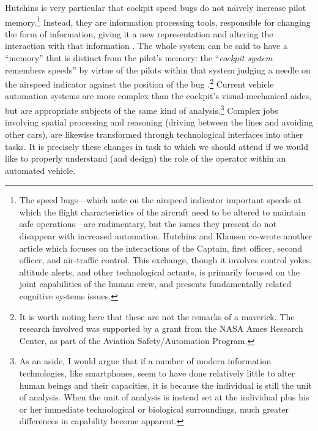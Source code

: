 Hutchins is very particular that cockpit speed bugs do not na\"{\i}vely
increase pilot memory.\footnote{The speed bugs---which note on the airspeed indicator
important speeds at which the 
flight characteristics of the aircraft need to be altered to maintain
safe operations---are rudimentary, but the issues they present do not disappear with
increased automation. Hutchins and Klausen co-wrote another
article \cite{hutchinsKlausen} which focuses on the
interactions of the Captain, first 
officer, second officer, and air-traffic control. This exchange,
though it involves control yokes, altitude alerts, and other
technological actants, is primarily focused on the joint capabilities
of the human crew, and presents fundamentally related cognitive
systems issues.} Instead, they 
are information processing tools, responsible for changing the form of
information, giving it a new representation and altering the
interaction with that information \cite[p. 282]{hutchinsCockpit}. The whole system can be said to
have a ``memory'' that is distinct from the pilot's memory: the
``\emph{cockpit system} remembers speeds'' by virtue of the pilots
within that system judging a needle on the airspeed indicator against
the position of the bug \cite[p.
  283]{hutchinsCockpit}.\footnote{It is 
  worth noting here that these are not the remarks of a maverick. The research involved
  was supported by a grant from the NASA Ames Research Center, as part
  of the Aviation Safety/Automation Program.}
Current vehicle automation systems are more complex than the cockpit's
visual-mechanical aides, but are appropriate subjects of the same kind
of analysis.\footnote{As an aside, I would argue that if a number of
  modern information technologies, like smartphones, seem to have done
relatively little to alter human beings and their capacities, it is
because the individual 
is still the unit of analysis. When the unit of analysis is instead
set at the individual plus his or her immediate technological or biological
surroundings, much greater differences in capability become apparent.}
Complex jobs involving spatial
processing and reasoning (driving between the lines and avoiding other
cars), are likewise transformed through technological interfaces into other
tasks. It is precisely these changes in task to which we should attend
if we would like to properly understand (and design) the role of the
operator within an automated vehicle. 


